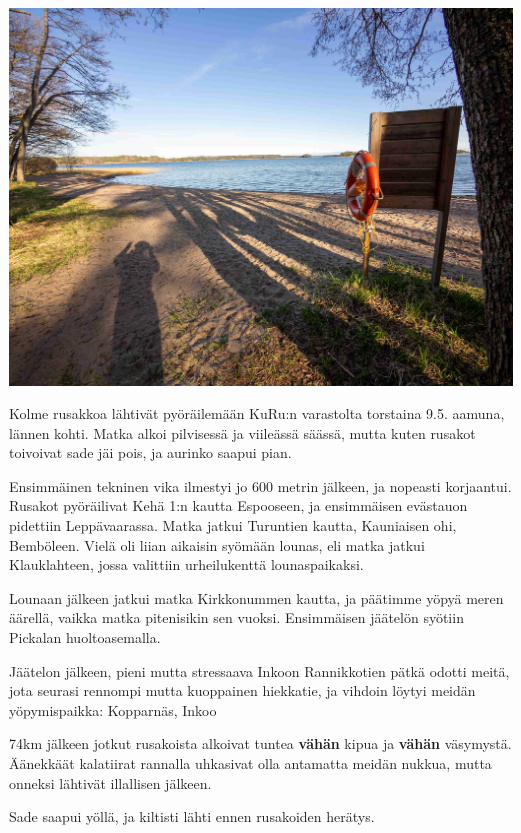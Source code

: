 \documentclass[10pt,finnish,a5paper,headings=small,twoside=semi]{scrartcl}
\begin{document}
\begin{multicols}{2}
\begin{center}
		\noindent\includegraphics[width=0.94\linewidth]{assets/pyörävaellus5}
	\end{center}

	\columnbreak

	Kolme rusakkoa lähtivät pyöräilemään KuRu:n varastolta torstaina
	9.5. aamuna, lännen kohti. Matka alkoi pilvisessä ja viileässä säässä,
	mutta kuten rusakot toivoivat sade jäi pois, ja aurinko saapui pian.

	Ensimmäinen tekninen vika ilmestyi jo 600 metrin jälkeen, ja nopeasti
	korjaantui. Rusakot pyöräilivat Kehä 1:n kautta Espooseen, ja
	ensimmäisen evästauon pidettiin Leppävaarassa. Matka jatkui Turuntien
	kautta, Kauniaisen ohi, Bemböleen. Vielä oli liian aikaisin syömään
	lounas, eli matka jatkui Klauklahteen, jossa valittiin urheilukenttä
	lounaspaikaksi.

	Lounaan jälkeen jatkui matka \mbox{Kirkkonummen} kautta, ja päätimme yöpyä
	meren äärellä, vaikka matka pitenisikin sen vuoksi.
	Ensimmäisen jäätelön syötiin Pickalan huoltoasemalla.

	Jäätelon jälkeen, pieni mutta stressaava Inkoon Rannikkotien pätkä
	odotti meitä, jota seurasi rennompi mutta kuoppainen hiekkatie, ja
	vihdoin löytyi meidän yöpymispaikka: Kopparnäs, Inkoo

	74km jälkeen jotkut rusakoista alkoivat tuntea \textbf{vähän} kipua ja
	\textbf{vähän} väsymystä. Äänekkäät kalatiirat rannalla uhkasivat olla
	antamatta meidän nukkua, mutta onneksi lähtivät illallisen jälkeen.

	\columnbreak

	Sade saapui yöllä, ja kiltisti lähti ennen rusakoiden herätys.


\end{multicols}
\end{document}
